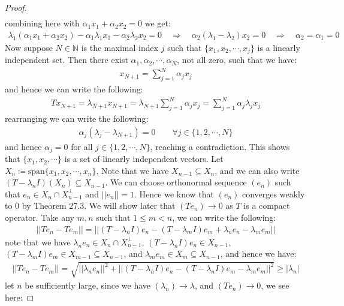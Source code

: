 \documentclass[11pt]{book}
\theoremstyle{break}
\theoremstyle{break}
\newcommand{\N}{\mathbb{N}}
\newcommand{\spa}{\text{span}}
\begin{document}
\begin{proof}
\begin{align*}
\end{align*} 
combining here with $\alpha_1 x_1 + \alpha_2 x_2 = 0$ we get:
\begin{align*}
\lambda_1(\alpha_1 x_1 + \alpha_2 x_2)-\alpha_1 \lambda_1 x_1 - \alpha_2 \lambda_2 x_2 = 0 \quad \Rightarrow \quad \alpha_2( \lambda_1 - \lambda_2) x_2 = 0 \quad \Rightarrow \quad \alpha_2 = \alpha_1 = 0
\end{align*}
Now suppose $N\in \N$ is the maximal index $j$ such that $\{x_1 , x_2,\cdots, x_j\}$ is a linearly independent set. Then there exist $\alpha_1 , \alpha_2,\cdots, \alpha_N$, not all zero, such that we have:
\begin{align*}
x_{N+1} = \sum_{j=1}^N \alpha_j x_j
\end{align*}
and hence we can write the following:
\begin{align*}
Tx_{N+1} = \lambda_{N+1} x_{N+1} = \lambda_{N+1} \sum_{j=1}^N \alpha_j x_j= \sum_{j=1}^N \alpha_j \lambda_j x_j
\end{align*}
rearranging we can write the following:
\begin{align*}
\alpha_j (\lambda_j - \lambda_{N+1}) = 0 \qquad \forall  j\in \{1,2,\cdots, N\}
\end{align*}
and hence $\alpha_j = 0$ for all $j\in \{1,2,\cdots, N\}$, reaching a contradiction. This shows that $\{x_1,x_2,\cdots \}$ is a set of linearly independent vectors.  Let $X_n \coloneqq \spa\{x_1,x_2,\cdots, x_n\}$. Note that we have $X_{n-1}\subseteq X_n$, and we can also write $(T-\lambda_n I) (X_n) \subseteq X_{n-1}$. We can choose orthonormal sequence $(e_n)$ such that $e_n \in X_n \cap X_{n-1}^\perp$ and $||e_n||=1$. Hence we know that $(e_n)$ converges weakly to $0$ by Theorem 27.3. We will show later that $(Te_n) \to 0$ as $T$ is a compact operator. Take any $m,n$ such that $1 \leq m < n$, we can write the following:
\begin{align*}
||Te_n - Te_m||= || (T-\lambda_n I) e_n - (T-\lambda_m I ) e_m + \lambda_n e_n - \lambda_m e_m||
\end{align*}
note that we have $\lambda_n e_n \in X_n \cap X_{n-1}^\perp$, $(T-\lambda_nI)e_n \in X_{n-1}$, $(T-\lambda_m I ) e_m \in X_{m-1}\subseteq X_{n-1}$, and $\lambda_m e_m \in X_{m}\subseteq X_{n-1}$, and hence we have:
\begin{align*}
||Te_n - Te_m||  = \sqrt{ ||\lambda_n e_n||^2 +||(T-\lambda_n I)e_n - (T-\lambda_nI) e_m - \lambda_m e_m ||^2 } \geq|\lambda_n |
\end{align*}
let $n$ be sufficiently large, since we have $(\lambda_n) \to \lambda$, and $(Te_n) \to 0$, we see here: 

\end{proof}
\end{document}

